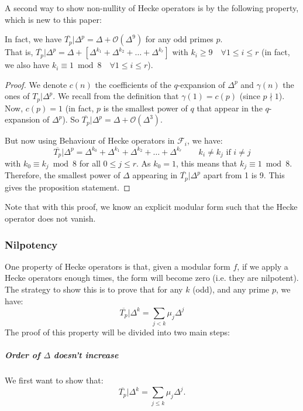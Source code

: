 A second way to show non-nullity of Hecke operators is by the following property, which is new to this paper:
\begin{property}
	In fact, we have $\overline{T_p}|\Delta^p = \Delta + \mathcal{O}(\Delta^9)$ for any odd primes $p$.\\
	That is, $\overline{T_p}|\Delta^p = \Delta + \left[ \Delta^{k_1} + \Delta^{k_2} + \dots + \Delta^{k_r} \right] $ with $k_i \geq 9 \quad \forall 1 \leq i \leq r$ (in fact, we also have $k_i \equiv 1 \bmod 8 \quad \forall 1 \leq i \leq r$).
\end{property}
\begin{proof}
	We denote $c(n)$ the coefficients of the $q$-expansion of $\Delta^p$ and $\gamma(n)$ the ones of $T_p|\Delta^p$.
	We recall from the definition that $\gamma(1)=c(p)$ (since $p \nmid 1$).
	Now, $c(p)=1$ (in fact, $p$ is the smallest power of $q$ that appear in the $q$-expansion of $\Delta^p$).
	So $\overline{T_p}|\Delta^p = \Delta + \mathcal{O}(\Delta^3)$.
	
	But now using Behaviour of Hecke operators in $\mathcal{F}_i$, we have:
	$$
	\overline{T_p}|\Delta^p = \Delta^{k_0} + \Delta^{k_1} + \Delta^{k_2} + \dots + \Delta^{k_r} \qquad k_i \neq k_j \text{ if } i \neq j
	$$
	with $k_0 \equiv k_j \bmod 8$ for all $0 \leq j \leq r$.
	As $k_0=1$, this means that $k_j \equiv 1 \bmod 8$.
	Therefore, the smallest power of $\Delta$ appearing in $\overline{T_p}|\Delta^p$ apart from 1 is 9.
	This gives the proposition statement.
\end{proof}
Note that with this proof, we know an explicit modular form such that the Hecke operator does not vanish.



\subsubsection{Nilpotency}
\label{NilpotencyHeckeOperators}
One property of Hecke operators is that, given a modular form $f$, if we apply a Hecke operators enough times, the form will become zero (i.e. they are nilpotent).
The strategy to show this is to prove that for any $k$ (odd), and any prime $p$, we have:
$$
\overline{T_p}| \Delta^k = \sum_{j < k} \mu_j \Delta^j
$$
The proof of this property will be divided into two main steps:

\subparagraph{Order of $\Delta$ doesn't increase}
We first want to show that:
$$
\overline{T_p}| \Delta^k = \sum_{j \leq k} \mu_j \Delta^j.
$$

